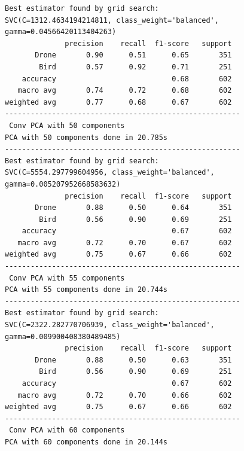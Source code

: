 \documentclass{cta-author}
\begin{document}
\begin{lstlisting}
Best estimator found by grid search:
SVC(C=1312.4634194214811, class_weight='balanced', gamma=0.04566420113404263)
              precision    recall  f1-score   support
       Drone       0.90      0.51      0.65       351
        Bird       0.57      0.92      0.71       251
    accuracy                           0.68       602
   macro avg       0.74      0.72      0.68       602
weighted avg       0.77      0.68      0.67       602
-------------------------------------------------------
 Conv PCA with 50 components
PCA with 50 components done in 20.785s
-------------------------------------------------------
Best estimator found by grid search:
SVC(C=5554.297799604956, class_weight='balanced', gamma=0.005207952668583632)
              precision    recall  f1-score   support
       Drone       0.88      0.50      0.64       351
        Bird       0.56      0.90      0.69       251
    accuracy                           0.67       602
   macro avg       0.72      0.70      0.67       602
weighted avg       0.75      0.67      0.66       602
-------------------------------------------------------
 Conv PCA with 55 components
PCA with 55 components done in 20.744s
-------------------------------------------------------
Best estimator found by grid search:
SVC(C=2322.282770706939, class_weight='balanced', gamma=0.009900408380489485)
              precision    recall  f1-score   support
       Drone       0.88      0.50      0.63       351
        Bird       0.56      0.90      0.69       251
    accuracy                           0.67       602
   macro avg       0.72      0.70      0.66       602
weighted avg       0.75      0.67      0.66       602
-------------------------------------------------------
 Conv PCA with 60 components
PCA with 60 components done in 20.144s
\end{lstlisting}
\end{document}
